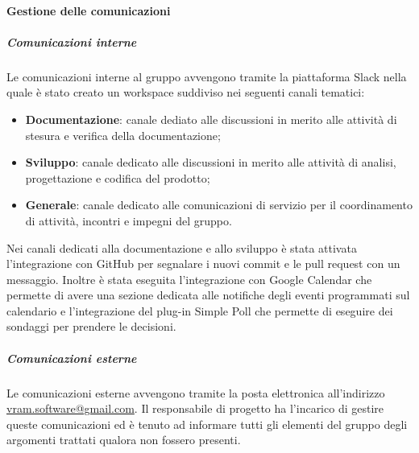 			\paragraph{Gestione delle comunicazioni}
				\subparagraph*{Comunicazioni interne}
					Le comunicazioni interne al gruppo avvengono tramite la piattaforma Slack nella quale è stato creato un workspace suddiviso nei seguenti canali tematici:
					\begin{itemize}
						\item \textbf{Documentazione}: canale dediato alle discussioni in merito alle attività di stesura e verifica della documentazione;
						\item \textbf{Sviluppo}: canale dedicato alle discussioni in merito alle attività di analisi, progettazione e codifica del prodotto;
						\item \textbf{Generale}: canale dedicato alle comunicazioni di servizio per il coordinamento di attività, incontri e impegni del gruppo.
					\end{itemize}
					Nei canali dedicati alla documentazione e allo sviluppo è stata attivata l'integrazione con GitHub per segnalare i nuovi commit e le pull request con un messaggio.
					Inoltre è stata eseguita l'integrazione con Google Calendar che permette di avere una sezione dedicata alle notifiche degli eventi programmati sul calendario e l'integrazione del plug-in Simple Poll che permette di eseguire dei sondaggi per prendere le decisioni.
				\subparagraph*{Comunicazioni esterne}
					Le comunicazioni esterne avvengono tramite la posta elettronica all'indirizzo \url{vram.software@gmail.com}.
					Il responsabile di progetto ha l'incarico di gestire queste comunicazioni ed è tenuto ad informare tutti gli elementi del gruppo degli argomenti trattati qualora non fossero presenti.
